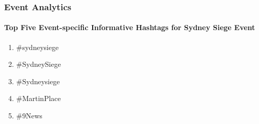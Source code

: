 %

\subsubsection{Event Analytics}

\paragraph{Top Five Event-specific Informative Hashtags for Sydney Siege Event}
\begin{enumerate}
\item \#sydneysiege 
\item \#SydneySiege
\item \#Sydneysiege
\item \#MartinPlace
\item \#9News                                                                                                                                                                                                                                                                                                                                                                                                                                                                                                                 
\end{enumerate}

